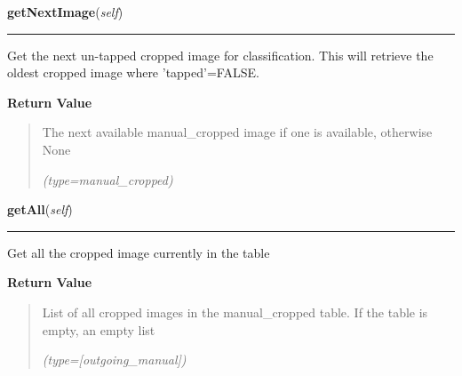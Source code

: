 \hspace{.8\funcindent}\begin{boxedminipage}{\funcwidth}

    \raggedright \textbf{getNextImage}(\textit{self})

    \vspace{-1.5ex}

    \rule{\textwidth}{0.5\fboxrule}
\setlength{\parskip}{2ex}
    Get the next un-tapped cropped image for classification. This will 
    retrieve the oldest cropped image where 'tapped'=FALSE.

\setlength{\parskip}{1ex}
      \textbf{Return Value}
    \vspace{-1ex}

      \begin{quote}
      The next available manual\_cropped image if one is available, 
      otherwise None

      {\it (type=manual\_cropped)}

      \end{quote}

    \end{boxedminipage}

    \label{src:dao:manual_cropped_dao:ManualCroppedDAO:getAll}

    \vspace{0.5ex}

\hspace{.8\funcindent}\begin{boxedminipage}{\funcwidth}

    \raggedright \textbf{getAll}(\textit{self})

    \vspace{-1.5ex}

    \rule{\textwidth}{0.5\fboxrule}
\setlength{\parskip}{2ex}
    Get all the cropped image currently in the table

\setlength{\parskip}{1ex}
      \textbf{Return Value}
    \vspace{-1ex}

      \begin{quote}
      List of all cropped images in the manual\_cropped table. If the table
      is empty, an empty list

      {\it (type=[outgoing\_manual])}

      \end{quote}

    \end{boxedminipage}

